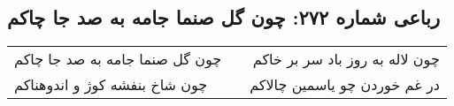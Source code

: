 \begin{center}
\section*{رباعی شماره ۲۷۲: چون گل صنما جامه به صد جا چاکم}
\label{sec:sh272}
\begin{longtable}{l p{0.5cm} r}
چون گل صنما جامه به صد جا چاکم
&&
چون لاله به روز باد سر بر خاکم
\\
چون شاخ بنفشه کوژ و اندوهناکم
&&
در غم خوردن چو یاسمین چالاکم
\\
\end{longtable}
\end{center}
